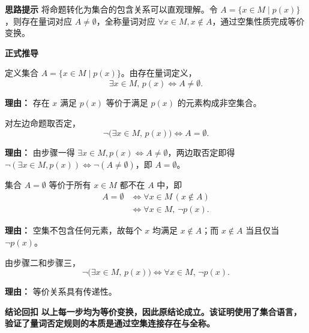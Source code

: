 \begin{proofbox}
	\textbf{\textcolor{CProof}{思路提示}}
	将命题转化为集合的包含关系可以直观理解。令 $A=\{x\in M\mid p(x)\}$，则存在量词对应 $A\neq\emptyset$，全称量词对应 $\forall x\in M, x\notin A$，通过空集性质完成等价变换。\par

	\medskip
	\textbf{\textcolor{CProof}{正式推导}}
	\begin{description}[style=nextline, leftmargin=2.8em, labelsep=0.5em, itemsep=0.55em]
		\item[\textbf{步骤一（集合对应）：}]
			定义集合 $A=\{x\in M\mid p(x)\}$。由存在量词定义，
			\[
				\exists x\in M,\,p(x) \iff A\neq\emptyset.
			\]
			\par\textbf{理由：} 存在 $x$ 满足 $p(x)$ 等价于满足 $p(x)$ 的元素构成非空集合。
		\item[\textbf{步骤二（否定转化）：}]
			对左边命题取否定，
			\[
				\neg\big(\exists x\in M,\,p(x)\big) \iff A=\emptyset.
			\]
			\par\textbf{理由：} 由步骤一得 $\exists x\in M,p(x)\iff A\neq\emptyset$，两边取否定即得 $\neg(\exists x\in M,p(x))\iff \neg(A\neq\emptyset)$，即 $A=\emptyset$。
		\item[\textbf{步骤三（空集等价于全称）：}]
			集合 $A=\emptyset$ 等价于所有 $x\in M$ 都不在 $A$ 中，即
			\[
				\begin{aligned}
					A=\emptyset &\iff \forall x\in M\,(x\notin A)\\&\iff \forall x\in M,\,\neg p(x).
			\end{aligned}
			\]
			\par\textbf{理由：} 空集不包含任何元素，故每个 $x$ 均满足 $x\notin A$；而 $x\notin A$ 当且仅当 $\neg p(x)$。
		\item[\textbf{步骤四（等价传递）：}]
			由步骤二和步骤三，
			\[
				\neg\big(\exists x\in M,\,p(x)\big) \iff \forall x\in M,\,\neg p(x).
			\]
			\par\textbf{理由：} 等价关系具有传递性。
	\end{description}
	\par

	\medskip
	\textbf{\textcolor{CProof}{结论回扣}}
	\textbf{以上每一步均为等价变换，因此原结论成立。该证明使用了集合语言，验证了量词否定规则的本质是通过空集连接存在与全称。}
\end{proofbox}
